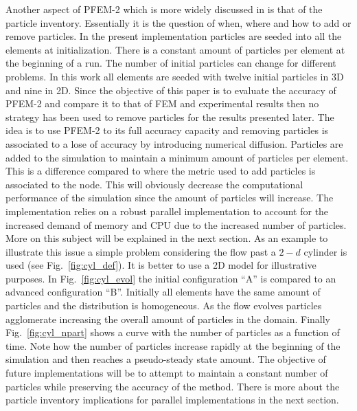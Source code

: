 Another aspect of PFEM-2 which is more widely discussed in \cite{gimenez-difusion} is that of the particle inventory. Essentially it is the question of when, where and how to add or remove particles. In the present implementation particles are seeded into all the elements at initialization. There is a constant amount of particles per element at the beginning of a run. The number of initial particles can change for different problems. In this work all elements are seeded with twelve initial particles in 3D and nine in 2D. Since the objective of this paper is to evaluate the accuracy of PFEM-2 and compare it to that of FEM and experimental results then no strategy has been used to remove particles for the results presented later. The idea is to use PFEM-2 to its full accuracy capacity and removing particles is associated to a lose of accuracy by introducing numerical diffusion. Particles are added to the simulation to maintain a minimum amount of particles per element. This is a difference compared to \cite{gimenez-difusion} where the metric used to add particles is associated to the node. This will obviously decrease the computational performance of the simulation since the amount of particles will increase. The implementation relies on a robust parallel implementation to account for the increased demand of memory and CPU due to the increased number of particles. More on this subject will be explained in the next section. As an example to illustrate this issue a simple problem considering the flow past a $2-d$ cylinder is used (see Fig.~\ref{fig:cyl_def}). It is better to use a 2D model for illustrative purposes. In Fig.~\ref{fig:cyl_evol} the initial configuration ``A'' is compared to an advanced configuration ``B''. Initially all elements have the same amount of particles and the distribution is homogeneous. As the flow evolves particles agglomerate increasing the overall amount of particles in the domain. Finally Fig.~\ref{fig:cyl_npart} shows a curve with the number of particles as a function of time. Note how the number of particles increase rapidly at the beginning of the simulation and then reaches a pseudo-steady state amount. The objective of future implementations will be to attempt to maintain a constant number of particles while preserving the accuracy of the method. There is more about the particle inventory implications for parallel implementations in the next section.
%
